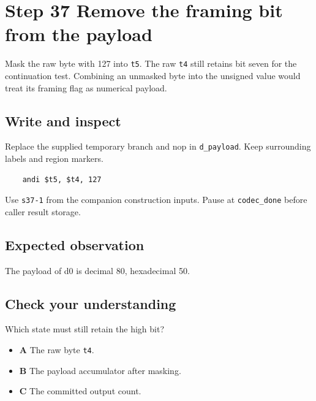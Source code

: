 \section{Step 37 Remove the framing bit from the payload}\label{delta-s37}

Mask the raw byte with 127 into \texttt{t5}. The raw \texttt{t4} still retains bit seven for the continuation test. Combining an unmasked byte into the unsigned value would treat its framing flag as numerical payload.

\subsection{Write and inspect}
Replace the supplied temporary branch and nop in \texttt{d\_payload}. Keep surrounding labels and region markers.

\begin{verbatim}
    andi $t5, $t4, 127
\end{verbatim}
Use \texttt{s37-1} from the companion construction inputs. Pause at \texttt{codec\_done} before caller result storage.

\subsection{Expected observation}
The payload of d0 is decimal 80, hexadecimal 50.

\subsection{Check your understanding}
Which state must still retain the high bit?

\begin{itemize}
  \item \textbf{A} The raw byte \texttt{t4}.
  \item \textbf{B} The payload accumulator after masking.
  \item \textbf{C} The committed output count.
\end{itemize}
